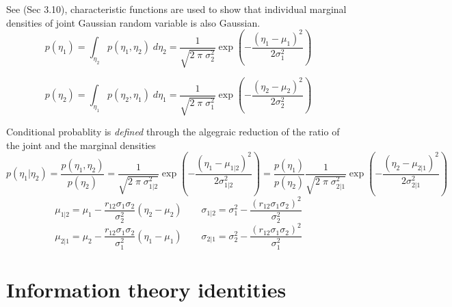 \documentclass{article}         %
\theoremstyle{definition}
\theoremstyle{remark}
\begin{document}
See \cite{maybeck1979stochastic} (Sec 3.10), characteristic functions 
are used to show that individual marginal
densities of joint  Gaussian random variable is also Gaussian.
\[
p(\eta_1) = 
\int_{\eta_2}
      p(\eta_1,\eta_2)
\;d\eta_2
 = \frac{1}{ \sqrt{2 \; \pi \; \sigma_2^2}} \exp\left( - \frac{(\eta_1 -
\mu_1)^2}{2 \sigma_1^2} \right)
\]

\[
p(\eta_2) = 
\int_{\eta_1}
      p(\eta_2,\eta_1)
\;d\eta_1
 = \frac{1}{ \sqrt{2 \; \pi \; \sigma_1^2}} \exp\left( - \frac{(\eta_2 -
\mu_2)^2}{2 \sigma_2^2} \right)
\]

Conditional probablity is \textit{defined} through the algegraic
reduction of the ratio of the joint and the marginal densities
\[
p(\eta_1|\eta_2) =  \frac{p(\eta_1,\eta_2)  }{p(\eta_2) }
 = \frac{1}{ \sqrt{2 \; \pi \; \sigma_{1|2}^2}}
    \exp\left( - \frac{(\eta_1 - \mu_{1|2})^2}{2 \sigma_{1|2}^2} \right)
 = 
\frac{p(\eta_1)}{p(\eta_2)}
   \frac{1}{ \sqrt{2 \; \pi \; \sigma_{2|1}^2}}
    \exp\left( - \frac{(\eta_2 - \mu_{2|1})^2}{2 \sigma_{2|1}^2} \right)
\]
\[
\mu_{1|2} =  \mu_1 - 
       \frac{r_{12} \sigma_1 \sigma_2 }{\sigma_2^2}
       (\eta_2 - \mu_2)
\qquad
\sigma_{1|2} = 
\sigma_1^2  - 
       \frac{(r_{12} \sigma_1 \sigma_2 )^2}{\sigma_2^2}
\]
\[
\mu_{2|1} =  \mu_2 - 
       \frac{r_{12} \sigma_1 \sigma_2 }{\sigma_1^2}
       (\eta_1 - \mu_1)
\qquad
\sigma_{2|1} = 
\sigma_2^2  - 
       \frac{(r_{12} \sigma_1 \sigma_2 )^2}{\sigma_1^2}
\]


\section{Information theory identities}
\end{document}
